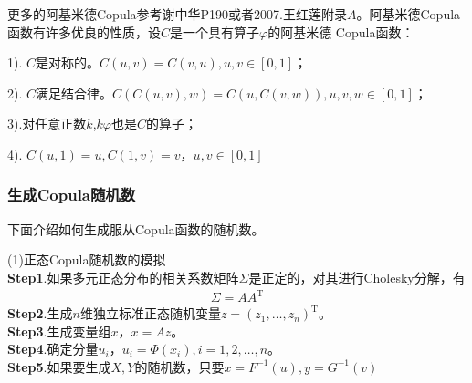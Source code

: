             \par
            更多的阿基米德Copula参考谢中华\cite{Xie}P190或者2007.王红莲\cite{Wang.2007}附录$A$。阿基米德Copula函数有许多优良的性质，设$C$是一个具有算子$\varphi$的阿基米德 Copula函数：\par
            1). $C$是对称的。$C(u,v) = C(v,u),u,v\in [0,1]$；\par
            2). $C$满足结合律。$C(C(u,v),w)= C(u,C(v,w)),u,v,w\in [0,1]$；\par
            3).对任意正数$k$,$k\varphi$也是$C$的算子；\par
            4). $C(u,1) = u,C(1,v) = v$，$u,v\in [0,1]$

        \subsubsection{生成Copula随机数}
            \par
            下面介绍如何生成服从Copula函数的随机数。
            \par
            (1)正态Copula随机数的模拟\\
            \textbf{Step1}.如果多元正态分布的相关系数矩阵$\Sigma$是正定的，对其进行Cholesky分解，有
            \begin{align*}
            \Sigma = AA^{\mathrm{T}}
            \end{align*}
            \textbf{Step2}.生成$n$维独立标准正态随机变量$z = (z_1,\dots,z_n)^{\mathrm{T}}$。\\
            \textbf{Step3}.生成变量组$x$，$x = Az$。\\
            \textbf{Step4}.确定分量$u_i$，$u_i = \varPhi(x_i),i = 1,2,\dots,n$。\\
            \textbf{Step5}.如果要生成$X,Y$的随机数，只要$x = F^{-1}(u),y = G^{-1}(v)$


